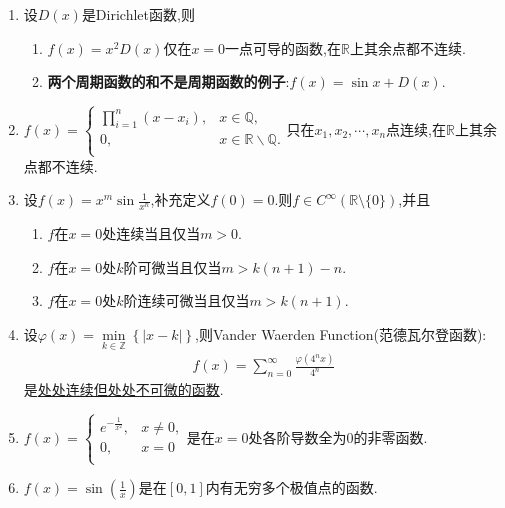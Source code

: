 \documentclass[../../main.tex]{subfiles}%
\begin{document}
\begin{proposition}[常见反例]\label{proposition:常见反例}
\begin{enumerate}
\item 设$D(x)$是Dirichlet函数,则
\begin{enumerate}[(1)]
\item $f(x) = x^2D(x)$仅在$x=0$一点可导的函数,在$\mathbb{R}$上其余点都不连续.

\item \textbf{两个周期函数的和不是周期函数的例子}:$f(x)=\sin x+D(x)$.
\end{enumerate}

\item $f\left( x \right) =\begin{cases}
\prod_{i=1}^n{\left( x-x_i \right)},&x\in \mathbb{Q} ,\\
0,&x\in \mathbb{R} \backslash \mathbb{Q} .\\
\end{cases}$只在$x_1,x_2,\cdots,x_n$点连续,在$\mathbb{R}$上其余点都不连续.

\item 设$f(x)=x^m \sin\frac{1}{x^n}$,补充定义$f(0)=0$.则$f\in C^{\infty}(\mathbb{R}\setminus \{0\})$,并且
\begin{enumerate}[(1)]
\item $f$在$x=0$处连续当且仅当$m>0$.
\item $f$在$x=0$处$k$阶可微当且仅当$m>k(n+1)-n$.
\item $f$在$x=0$处$k$阶连续可微当且仅当$m>k(n+1)$.
\end{enumerate}

\item 设$\varphi \left( x \right) =\underset{k\in \mathbb{Z}}{\min}\left\{ \left| x-k \right| \right\}$,则Vander Waerden Function(范德瓦尔登函数):
\begin{align*}
f\left( x \right) =\sum_{n=0}^{\infty}{\frac{\varphi \left( 4^nx \right)}{4^n}}
\end{align*}
是\href{https://mp.weixin.qq.com/s/ki-x99Me_kKvQUvfXS-GGQ}{处处连续但处处不可微的函数}.

\item $f\left( x \right) =\begin{cases}
e^{-\frac{1}{x^2}},&x\neq 0,\\
0,&x=0\\
\end{cases}$是在$x=0$处各阶导数全为0的非零函数.

\item $f\left( x \right) =\sin \left( \frac{1}{x} \right) $是在$[0,1]$内有无穷多个极值点的函数.


\end{enumerate}
\end{proposition}
\end{document}
